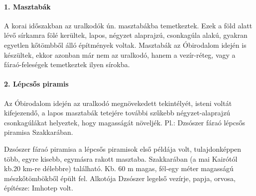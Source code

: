 \begin{figure}
\end{figure}

\paragraph{1. Masztabák} 
A korai időszakban az uralkodók ún. masztabákba temetkeztek. Ezek a föld alatt lévő sírkamra fölé kerültek, lapos, négyzet alaprajzú, csonkagúla alakú, gyakran egyetlen kőtömbből álló építmények voltak. Masztabák az Óbirodalom idején is készültek, ekkor azonban már nem az uralkodó, hanem a vezír-réteg, vagy a fáraó-feleségek temetkeztek ilyen sírokba.

\begin{figure}
\end{figure}

\paragraph{2. Lépcsős piramis}
Az Óbirodalom idején az uralkodó megnövekedett tekintélyét, isteni voltát kifejezendő, a lapos masztabák tetejére további szűkebb négyzet-alaprajzú csonkagúlákat helyeztek, hogy magasságát növeljék. Pl.: Dzsószer fáraó lépcsős piramisa Szakkarában.

Dzsószer fáraó piramisa a lépcsős piramisok első példája volt, tulajdonképpen több, egyre kisebb, egymásra rakott masztaba. Szakkarában (a mai Kairótól kb.20 km-re délebbre) található. Kb. 60 m magas, fél-egy méter magasságú mészkőtömbökből épült fel. Alkotója Dzsószer legelső vezírje, papja, orvosa, építésze: Imhotep volt.

\begin{figure}
\end{figure}

